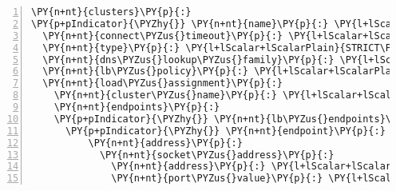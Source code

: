 \begin{Verbatim}[commandchars=\\\{\},numbers=left,firstnumber=1,stepnumber=1,frame=single]
\PY{n+nt}{clusters}\PY{p}{:}
\PY{p+pIndicator}{\PYZhy{}} \PY{n+nt}{name}\PY{p}{:} \PY{l+lScalar+lScalarPlain}{hivemq}
  \PY{n+nt}{connect\PYZus{}timeout}\PY{p}{:} \PY{l+lScalar+lScalarPlain}{0.25s}
  \PY{n+nt}{type}\PY{p}{:} \PY{l+lScalar+lScalarPlain}{STRICT\PYZus{}DNS}
  \PY{n+nt}{dns\PYZus{}lookup\PYZus{}family}\PY{p}{:} \PY{l+lScalar+lScalarPlain}{v4\PYZus{}only}
  \PY{n+nt}{lb\PYZus{}policy}\PY{p}{:} \PY{l+lScalar+lScalarPlain}{round\PYZus{}robin}
  \PY{n+nt}{load\PYZus{}assignment}\PY{p}{:}
    \PY{n+nt}{cluster\PYZus{}name}\PY{p}{:} \PY{l+lScalar+lScalarPlain}{hivemq}
    \PY{n+nt}{endpoints}\PY{p}{:}
    \PY{p+pIndicator}{\PYZhy{}} \PY{n+nt}{lb\PYZus{}endpoints}\PY{p}{:}
      \PY{p+pIndicator}{\PYZhy{}} \PY{n+nt}{endpoint}\PY{p}{:}
          \PY{n+nt}{address}\PY{p}{:}
            \PY{n+nt}{socket\PYZus{}address}\PY{p}{:}
              \PY{n+nt}{address}\PY{p}{:} \PY{l+lScalar+lScalarPlain}{example.cluster.internal}
              \PY{n+nt}{port\PYZus{}value}\PY{p}{:} \PY{l+lScalar+lScalarPlain}{1883}
\end{Verbatim}
